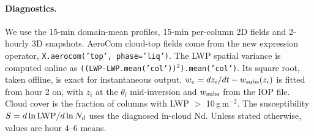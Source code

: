 \paragraph{Diagnostics.} We use the 15-min domain-mean profiles, 15-min per-column 2D fields and 2-hourly 3D snapshots.
AeroCom cloud-top fields come from the new expression operator, \texttt{X.aerocom('top', phase='liq')}.
The LWP spatial variance is computed online as \texttt{((LWP-LWP.mean('col'))$^2$).mean('col')}. Its square root, taken offline, is exact for instantaneous output.
$w_e = dz_i/dt - w_{\rm subs}(z_i)$ is fitted from hour 2 on, with $z_i$ at the $\theta_l$ mid-inversion and $w_{\rm subs}$ from the IOP file.
Cloud cover is the fraction of columns with LWP $>$ 10\,g\,m$^{-2}$.
The susceptibility $S = d\ln{\rm LWP}/d\ln N_d$ uses the diagnosed in-cloud Nd. Unless stated otherwise, values are hour 4--6 means.
